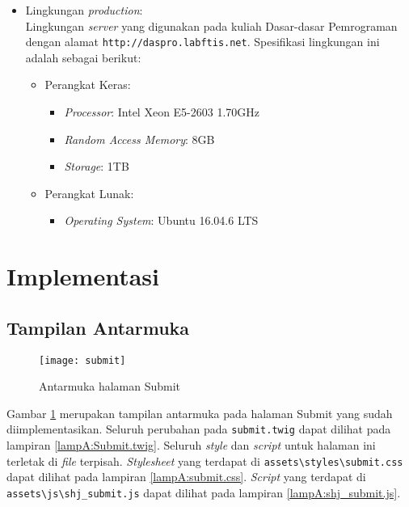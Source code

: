 \begin{itemize}
    \item Lingkungan \textit{production}: \\ Lingkungan \textit{server} yang digunakan pada kuliah Dasar-dasar Pemrograman dengan alamat \verb|http://daspro.labftis.net|. Spesifikasi lingkungan ini adalah sebagai berikut:
    \begin{itemize}
    \item Perangkat Keras:
        \begin{itemize}
            \item \textit{Processor}: Intel Xeon E5-2603 1.70GHz
            \item \textit{Random Access Memory}: 8GB
            \item \textit{Storage}: 1TB
        \end{itemize}
            \item Perangkat Lunak:
        \begin{itemize}
            \item \textit{Operating System}: Ubuntu 16.04.6 LTS
        \end{itemize}
    \end{itemize}
\end{itemize}

\section{Implementasi}
\label{sec:5:implementasi}

\subsection{Tampilan Antarmuka}
\label{subsec:5:antarmuka}

\begin{figure}[H]
	\centering  
	\texttt{[image: submit]}  
	\caption{Antarmuka halaman Submit} 
	\label{fig:5:antarmuka} 
\end{figure}

Gambar \ref{fig:5:antarmuka} merupakan tampilan antarmuka pada halaman Submit yang sudah diimplementasikan. Seluruh perubahan pada \verb|submit.twig| dapat dilihat pada lampiran \ref{lampA:Submit.twig}. Seluruh \textit{style} dan \textit{script} untuk halaman ini terletak di \textit{file} terpisah. \textit{Stylesheet} yang terdapat di \verb|assets\styles\submit.css| dapat dilihat pada lampiran \ref{lampA:submit.css}. \textit{Script} yang terdapat di \verb|assets\js\shj_submit.js| dapat dilihat pada lampiran \ref{lampA:shj_submit.js}.


